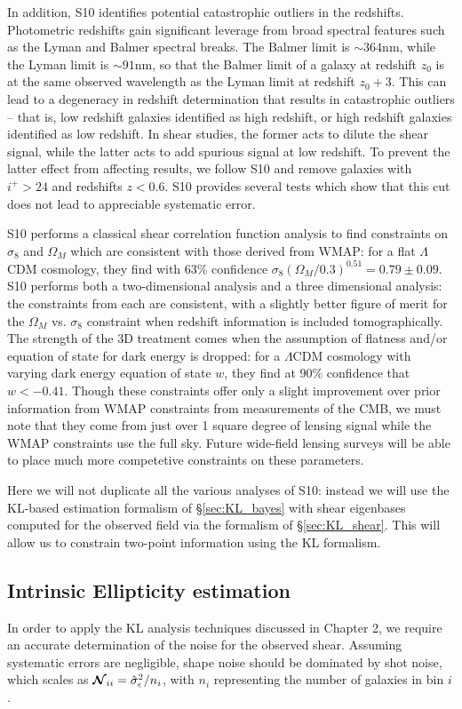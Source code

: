 In addition, S10 identifies potential catastrophic outliers in the redshifts.
Photometric redshifts gain significant leverage from broad spectral features
such as the Lyman and Balmer spectral breaks.  The Balmer limit is
$\sim 364$nm, while the Lyman limit is $\sim 91$nm, so that the Balmer limit
of a galaxy at redshift $z_0$ is at the same observed wavelength as the
Lyman limit at redshift $z_0 + 3$.  This can lead to a degeneracy in redshift
determination that results in catastrophic outliers -- that is, low redshift
galaxies identified as high redshift, or high redshift galaxies identified as
low redshift.  In shear studies, the former acts to dilute the shear signal,
while the latter acts to add spurious signal at low redshift.  To prevent
the latter effect from affecting results, we follow S10 and remove galaxies
with $i^+ > 24$ and redshifts $z < 0.6$.  S10 provides several tests which
show that this cut does not lead to appreciable systematic error.

S10 performs a classical shear correlation function analysis to find
constraints on $\sigma_8$ and $\Omega_M$ which are consistent with
those derived from WMAP: for a flat $\Lambda$CDM cosmology, they
find with 63\% confidence 
$\sigma_8(\Omega_M / 0.3)^{0.51} = 0.79 \pm 0.09$.  S10 performs both a
two-dimensional analysis and a three dimensional analysis: the constraints
from each are consistent, with a slightly better figure of merit for the
$\Omega_M$ vs. $\sigma_8$ constraint when redshift information is included
tomographically.  The strength of the
3D treatment comes when the assumption of flatness and/or equation of
state for dark energy is dropped: for a
$\Lambda$CDM cosmology with varying dark energy equation of state $w$,
they find at 90\% confidence that $w < -0.41$.
Though these constraints offer only a slight improvement over prior
information from WMAP constraints from measurements of the CMB, we must
note that they come from just over 1 square degree of lensing signal while the
WMAP constraints use the full sky.  Future wide-field
lensing surveys will be able to place much more competetive constraints
on these parameters.

Here we will not duplicate all the various analyses of S10: instead we
will use the KL-based estimation formalism of \S\ref{sec:KL_bayes} with
shear eigenbases computed for the observed field via the formalism
of \S\ref{sec:KL_shear}.  This will allow us to constrain two-point
information using the KL formalism.

\subsection{Intrinsic Ellipticity estimation}
\label{sec:bootstrap}
In order to apply the KL analysis techniques discussed in Chapter 2,
we require an accurate
determination of the noise for the observed shear.  Assuming systematic
errors are negligible, shape noise should be dominated by shot noise,
which scales as $\boldsymbol{\mathcal{N}}_{ii} = \hat{\sigma}_\epsilon^2 / n_i$,
with $n_i$ representing the number of galaxies in bin $i$.

